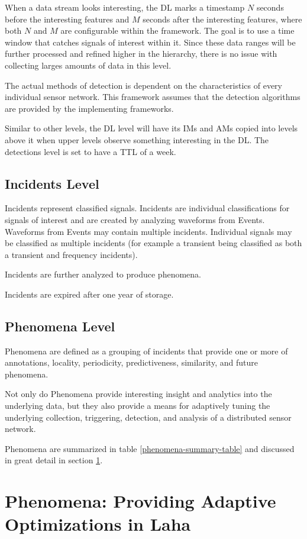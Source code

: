 When a data stream looks interesting, the DL marks a timestamp $N$ seconds before the interesting features and $M$ seconds after the interesting features, where both $N$ and $M$ are configurable within the framework. The goal is to use a time window that catches signals of interest within it. Since these data ranges will be further processed and refined higher in the hierarchy, there is no issue with collecting larges amounts of data in this level. 

The actual methods of detection is dependent on the characteristics of every individual sensor network. This framework assumes that the detection algorithms are provided by the implementing frameworks.

Similar to other levels, the DL level will have its IMs and AMs copied into levels above it when upper levels observe something interesting in the DL. The detections level is set to have a TTL of a week.

\subsection{Incidents Level}
Incidents represent classified signals. Incidents are individual classifications for signals of interest and are created by analyzing waveforms from Events. Waveforms from Events may contain multiple incidents. Individual signals may be classified as multiple incidents (for example a transient being classified as both a transient and frequency incidents). 

Incidents are further analyzed to produce phenomena. 

Incidents are expired after one year of storage. 


\subsection{Phenomena Level}
Phenomena are defined as a grouping of incidents that provide one or more of annotations, locality, periodicity, predictiveness, similarity, and future phenomena. 

Not only do Phenomena provide interesting insight and analytics into the underlying data, but they also provide a means for adaptively tuning the underlying collection, triggering, detection, and analysis of a distributed sensor network.

Phenomena are summarized in table \ref{phenomena-summary-table} and discussed in great detail in section \ref{phenomena}.

\section{Phenomena: Providing Adaptive Optimizations in Laha} \label{phenomena}

